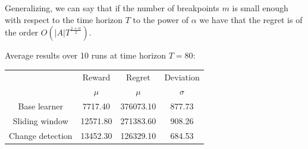 Generalizing, we can say that if the number of breakpoints $m$ is small enough with respect to the time horizon $T$ to the power of $\alpha$ we have that the regret is of the order $O\left( \vert A \vert T^{\frac{1+\alpha}{2}} \right)$.

Average results over 10 runs at time horizon $T = 80$:

\begin{table}[h]
    \center
    \begin{tabular}{|c|cc|c|}
    \hline \hline
        \cellcolor{blue!25} & Reward 	& Regret	& Deviation \\
    \cline{2-4}
        \cellcolor{blue!25} & $\mu$		& $\mu$		& $\sigma$	\\
    \hline \hline
        Base learner		& 7717.40	& 376073.10	& 877.73	\\
    \hline
        Sliding window		& 12571.80	& 271383.60	& 908.26	\\
    \hline
        Change detection	& 13452.30	& 126329.10	& 684.53	\\
    \hline \hline
    \end{tabular}
\end{table}

